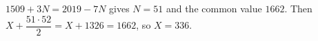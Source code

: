 $1509+3N=2019-7N$ gives $N=51$ and the common value $1662$. Then $X+\dfrac{51\cdot52}2=X+1326=1662$, so $X=\boxed{336}$.
